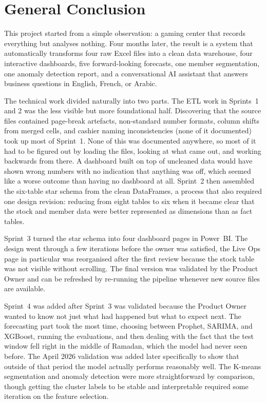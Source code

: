 \documentclass[12pt, a4paper]{report}
\begin{document}
\chapter*{General Conclusion}

This project started from a simple observation: a gaming center that records
everything but analyses nothing. Four months later, the result is a system that
automatically transforms four raw Excel files into a clean data warehouse, four
interactive dashboards, five forward-looking forecasts, one member segmentation,
one anomaly detection report, and a conversational AI assistant that answers
business questions in English, French, or Arabic.

The technical work divided naturally into two parts. The ETL work in Sprints~1 and 2
was the less visible but more foundational half. Discovering that the source files
contained page-break artefacts, non-standard number formats, column shifts from
merged cells, and cashier naming inconsistencies (none of it documented) took up
most of Sprint~1. None of this was documented anywhere, so most of it had to be
figured out by loading the files, looking at what came out, and working backwards
from there. A dashboard built on top of uncleaned data would have shown wrong
numbers with no indication that anything was off, which seemed like a worse
outcome than having no dashboard at all.
Sprint~2 then assembled the six-table star schema from the clean DataFrames, a
process that also required one design revision: reducing from eight tables to six
when it became clear that the stock and member data were better represented as
dimensions than as fact tables.

Sprint~3 turned the star schema into four dashboard pages in Power~BI. The
design went through a few iterations before the owner was satisfied, the
Live Ops page in particular was reorganised after the first review because
the stock table was not visible without scrolling. The final version was
validated by the Product Owner and can be refreshed by re-running the pipeline
whenever new source files are available.

Sprint~4 was added after Sprint~3 was validated because the Product Owner wanted
to know not just what had happened but what to expect next. The forecasting part
took the most time, choosing between Prophet, SARIMA, and XGBoost, running the
evaluations, and then dealing with the fact that the test window fell right in the
middle of Ramadan, which the model had never seen before. The April 2026 validation
was added later specifically to show that outside of that period the model actually
performs reasonably well. The K-means segmentation and anomaly detection were more
straightforward by comparison, though getting the cluster labels to be stable and
interpretable required some iteration on the feature selection.
\end{document}
